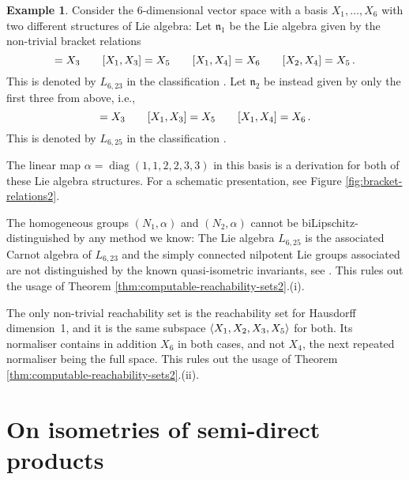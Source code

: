 \documentclass[a4paper,12pt]{amsart}
\DeclareMathOperator{\diag}{diag}
\DeclarePairedDelimiter\braket{\langle}{\rangle}
\theoremstyle{plain}
\theoremstyle{definition}
\newtheorem{Esim}[maar]{Example}
\theoremstyle{plain}
\theoremstyle{remark}
\begin{document}
\begin{Esim} \label{esim:6D-heintzes-different-nilrad2}
	Consider the 6-dimensional vector space with a basis \( X_1,\ldots,X_6 \) with two different structures of Lie algebra:
	Let \( \mathfrak{n}_1 \) be the Lie algebra  given by the non-trivial bracket relations
	\begin{equation*}
	[X_1,X_2] = X_3 \qquad
	[X_1,X_3] = X_5 \qquad
	[X_1,X_4] = X_6 \qquad
	[X_2,X_4] = X_5 \piste
	\end{equation*}
	This is denoted by \( L_{6,23} \) in the classification \cite{deGraaf-2007-dim_6_nilpotent_lie_algebras}.
	Let \( \mathfrak{n}_2 \) be instead given by only the first three from above, i.e.,
	\begin{equation*}
	[X_1,X_2] = X_3 \qquad
	[X_1,X_3] = X_5 \qquad
	[X_1,X_4] = X_6 \piste
	\end{equation*}
	This is denoted by \( L_{6,25} \) in the classification \cite{deGraaf-2007-dim_6_nilpotent_lie_algebras}. 
	
	
	The linear map \( \alpha = \diag(1,1,2,2,3,3) \) in this basis is a derivation for both of these Lie algebra structures.
	For a schematic presentation, see Figure \ref{fig:bracket-relations2}. 
	
	The homogeneous groups \((N_1,\alpha)\) and \( (N_2,\alpha) \) cannot be biLipschitz-distinguished by any method we know:
	The Lie algebra \( L_{6,25} \) is the associated Carnot algebra of \( L_{6,23} \) and the simply connected nilpotent Lie groups associated are not distinguished by the known quasi-isometric invariants, see \cite[p.\ 339]{Cornulier:qihlc}. This rules out the usage of Theorem \ref{thm:computable-reachability-sets2}.(i).
	
	The only non-trivial reachability set is the reachability set for Hausdorff dimension~1, and it is the same subspace \( \braket{X_1,X_2,X_3,X_5} \) for both. Its normaliser contains in addition \( X_6 \) in both cases, and not \( X_4 \), the next repeated normaliser being the full space. This rules out the usage of Theorem \ref{thm:computable-reachability-sets2}.(ii).
\end{Esim}








\section{On isometries of semi-direct products}
\end{document}
